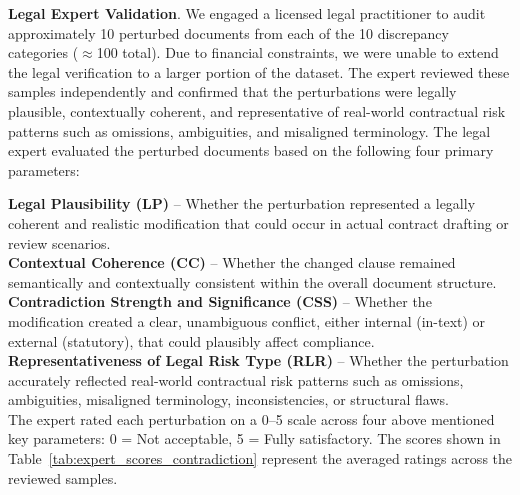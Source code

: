 \documentclass[11pt]{article}
\begin{document}
\textbf{Legal Expert Validation}. We engaged a licensed legal practitioner to audit approximately 10 perturbed documents from each of the 10 discrepancy categories ($\approx$100 total). Due to financial constraints, we were unable to extend the legal verification to a larger portion of the dataset. The expert reviewed these samples independently and confirmed that the perturbations were legally plausible, contextually coherent, and representative of real-world contractual risk patterns such as omissions, ambiguities, and misaligned terminology. The legal expert evaluated the perturbed documents based on the following four primary parameters:

\textbf{Legal Plausibility (LP)} -- Whether the perturbation represented a legally coherent and realistic modification that could occur in actual contract drafting or review scenarios.\\

\textbf{Contextual Coherence (CC)} -- Whether the changed clause remained semantically and contextually consistent within the overall document structure.\\

\textbf{Contradiction Strength and Significance (CSS)} -- Whether the modification created a clear, unambiguous conflict, either internal (in-text) or external (statutory), that could plausibly affect compliance.\\

\textbf{Representativeness of Legal Risk Type (RLR)} -- Whether the perturbation accurately reflected real-world contractual risk patterns such as omissions, ambiguities, misaligned terminology, inconsistencies, or structural flaws.\\

The expert rated each perturbation on a 0–5 scale across four above mentioned key parameters:
0 = Not acceptable, 5 = Fully satisfactory.
The scores shown in Table~\ref{tab:expert_scores_contradiction} represent the averaged ratings across the reviewed samples.
\end{document}

